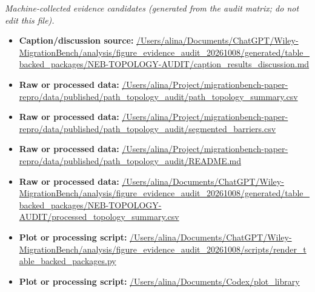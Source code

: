 \emph{Machine-collected evidence candidates (generated from the audit matrix; do not edit this file).}
\begin{itemize}[leftmargin=1.4em,noitemsep]
\item \textbf{Caption/discussion source:} \url{/Users/alina/Documents/ChatGPT/Wiley-MigrationBench/analysis/figure_evidence_audit_20261008/generated/table_backed_packages/NEB-TOPOLOGY-AUDIT/caption_results_discussion.md}
\item \textbf{Raw or processed data:} \url{/Users/alina/Project/migrationbench-paper-repro/data/published/path_topology_audit/path_topology_summary.csv}
\item \textbf{Raw or processed data:} \url{/Users/alina/Project/migrationbench-paper-repro/data/published/path_topology_audit/segmented_barriers.csv}
\item \textbf{Raw or processed data:} \url{/Users/alina/Project/migrationbench-paper-repro/data/published/path_topology_audit/README.md}
\item \textbf{Raw or processed data:} \url{/Users/alina/Documents/ChatGPT/Wiley-MigrationBench/analysis/figure_evidence_audit_20261008/generated/table_backed_packages/NEB-TOPOLOGY-AUDIT/processed_topology_summary.csv}
\item \textbf{Plot or processing script:} \url{/Users/alina/Documents/ChatGPT/Wiley-MigrationBench/analysis/figure_evidence_audit_20261008/scripts/render_table_backed_packages.py}
\item \textbf{Plot or processing script:} \url{/Users/alina/Documents/Codex/plot_library}
\end{itemize}
